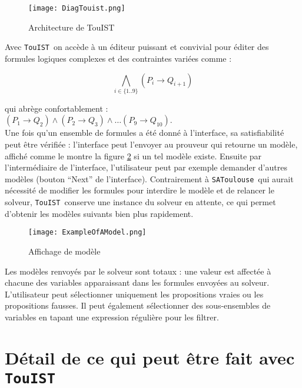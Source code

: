 \documentclass{iaf}
\newcommand{\IMPL}[0]{\longrightarrow}
\newcommand{\AND}[0]{\wedge}
\newcommand{\satoulouse}{{\sc Satoulouse}\xspace}
\renewcommand{\satoulouse}{{\sc \texttt {SAToulouse}}}
\newcommand{\nameTool}{{\sc \texttt {TouIST}}}
\begin{document}
\begin{figure}[htbp]
\centering
\texttt{[image: DiagTouist.png]}
  \caption{Architecture de TouIST}
  \label{fig:architectureTouisT}
\end{figure}

Avec \nameTool\ on acc\`ede \`a un \'editeur puissant et convivial pour \'editer des formules logiques complexes et des contraintes vari\'ees comme :

$$\bigwedge_{i \in \{1..9\}} (P_i \IMPL Q_{i+1})$$

qui abr\`ege confortablement :\\ 

$(P_1 \IMPL Q_2) \AND (P_2 \IMPL Q_3) \AND \ldots (P_9\IMPL Q_{10})$. 
\\

Une fois qu'un ensemble de formules a \'et\'e donn\'e \`a l'interface, sa satisfiabilit\'e peut \^etre v\'erifi\'ee : l'interface peut l'envoyer au prouveur qui retourne un mod\`ele, affich\'{e} comme le montre la figure \ref{fig:ExampleOfAModel} si un tel mod\`{e}le existe. Ensuite par l'interm\'ediaire de l'interface, l'utilisateur peut par exemple demander d'autres mod\`eles (bouton ``Next'' de l'interface). Contrairement \`a \satoulouse\ qui aurait n\'ecessit\'e de modifier les formules pour interdire le mod\`ele et de relancer le solveur, \nameTool\ conserve une instance du solveur en attente, ce qui permet d'obtenir les mod\`eles suivants bien plus rapidement.

\begin{figure}[htbp]
\centering
\texttt{[image: ExampleOfAModel.png]}
  \caption{Affichage de mod\`{e}le}
  \label{fig:ExampleOfAModel}
\end{figure}

Les mod\`{e}les renvoy\'{e}s par le solveur sont totaux : une valeur est affect\'{e}e \`{a} chacune des variables apparaissant dans les formules envoy\'{e}es au solveur. L'utilisateur peut s\'{e}lectionner uniquement les propositions vraies ou les propositions fausses. Il peut \'{e}galement s\'{e}lectionner des sous-ensembles de variables en tapant une expression r\'{e}guli\`{e}re pour les filtrer.


\section{D\'etail de ce qui peut \^etre fait avec \nameTool\label{sec:sat_tobedone}}
\end{document}
